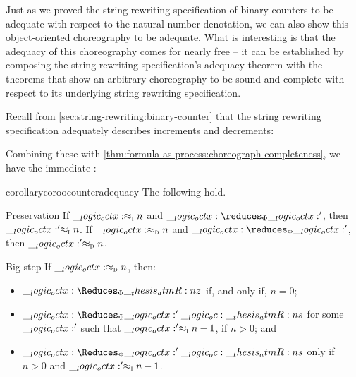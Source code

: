Just as we proved the string rewriting specification of binary counters to be adequate with respect to the natural number denotation, we can also show this object-oriented choreography to be adequate.
What is interesting is that the adequacy of this choreography comes for nearly free -- it can be established by composing the string rewriting specification's adequacy theorem with the theorems that show an arbitrary choreography to be sound and complete with respect to its underlying string rewriting specification.




Recall from \cref{sec:string-rewriting:binary-counter} that the string rewriting specification adequately describes increments and decrements:
\thmadequacysmalldecstring*
%
\coradequacydecstring*

Combining these  with \cref{thm:formula-as-process:choreograph-completeness}, we have the immediate :
\begin{restatable}[
  name=Adequacy of object-oriented choreography,
  label=cor:choreographies:oo-counter-adequacy
]{corollary}{coroocounteradequacy}
  The following hold.
  \begin{thmdescription}[nosep]
  \item[Preservation]
    If $\__logic_octx: \approx\sb{\text{\normalfont\scshape i}} n$ and $\octx \reduces_{\orsig} \octx'$, then $\__logic_octx:' \approx\sb{\text{\normalfont\scshape i}} n$.
    If $\__logic_octx: \approx\sb{\text{\normalfont\scshape d}} n$ and $\octx \reduces_{\orsig} \octx'$, then $\__logic_octx:' \approx\sb{\text{\normalfont\scshape d}} n$.

  \item[Big-step]
    If $\__logic_octx: \approx\sb{\text{\normalfont\scshape d}} n$, then:
    \begin{itemize}[nosep]
    \item $\octx \Reduces_{\orsig} \atmR{z}$ if, and only if, $n = 0$;
    \item $\octx \Reduces_{\orsig} \octx' \oc \atmR{s}$ for some $\__logic_octx:'$ such that $\__logic_octx:' \approx\sb{\text{\normalfont\scshape i}} n-1$, if $n > 0$; and
    \item $\octx \Reduces_{\orsig} \octx' \oc \atmR{s}$ only if $n > 0$ and $\__logic_octx:' \approx\sb{\text{\normalfont\scshape i}} n-1$.
    \end{itemize}
  \end{thmdescription}
\end{restatable}



